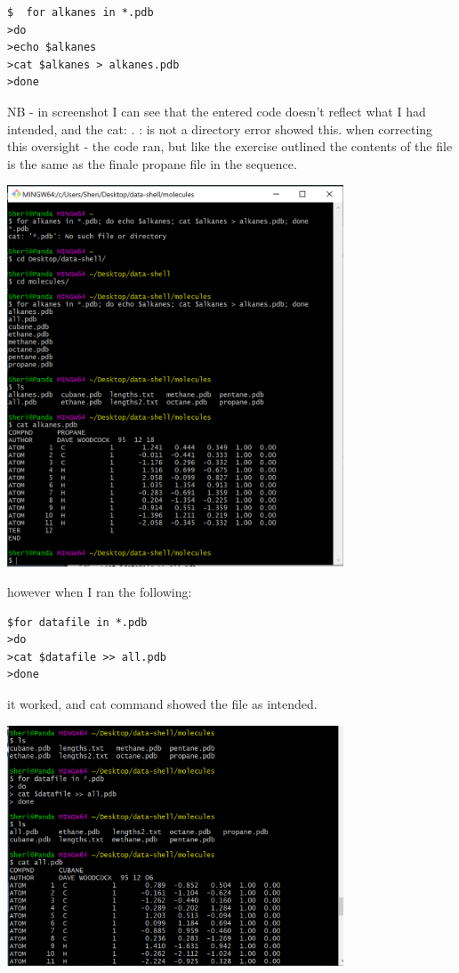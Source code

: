 \documentclass{article}
\begin{document}
\begin{verbatim}
$  for alkanes in *.pdb
>do
>echo $alkanes
>cat $alkanes > alkanes.pdb
>done
\end{verbatim}

NB - in screenshot I can see that the entered code doesn't reflect what I had intended, and the cat: . : is not a directory error showed this.
when correcting this oversight - the code ran, but like the exercise outlined the contents of the file is the same as the finale propane file in the sequence.

\includegraphics[width=10cm]{Images/GitBash_048.PNG}

however when I ran the following:

\begin{verbatim}
$for datafile in *.pdb
>do
>cat $datafile >> all.pdb
>done
\end{verbatim}

it worked, and cat command showed the file as intended.

\includegraphics[width=10cm]{Images/GitBash_047.PNG}
\end{document}
